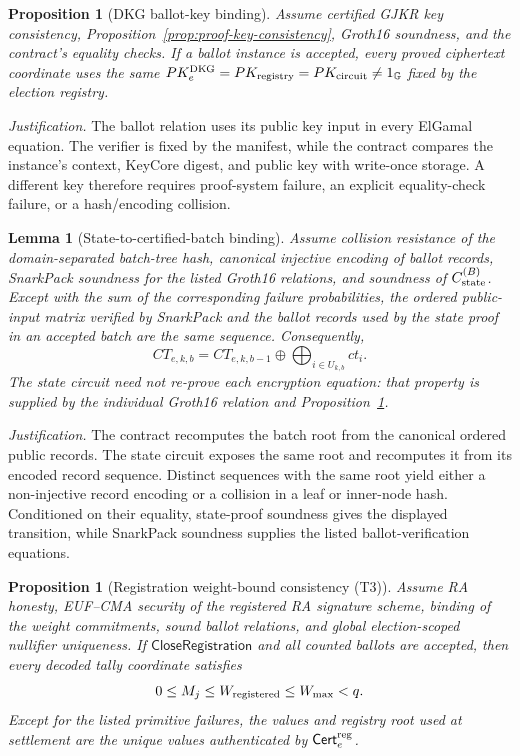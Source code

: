 \documentclass[pdflatex,sn-mathphys-num]{sn-jnl}%
\theoremstyle{thmstyleone}%
\newtheorem{proposition}[theorem]{Proposition}%
\newtheorem{lemma}[theorem]{Lemma}%
\theoremstyle{thmstyletwo}%
\theoremstyle{thmstylethree}%
\begin{document}
\begin{proposition}[DKG ballot-key binding]
\label{prop:vote-finalized-key}
Assume certified GJKR key consistency, Proposition~\ref{prop:proof-key-consistency},
Groth16 soundness, and the contract's equality checks.  If a ballot instance is
accepted, every proved ciphertext coordinate uses the same
$PK_e^{\rm DKG}=PK_{\rm registry}=PK_{\rm circuit}\neq1_{\mathbb G}$ fixed by
the election registry.
\end{proposition}

\textit{Justification.}  The ballot relation uses its public key input in every
ElGamal equation.  The verifier is fixed by the manifest, while the contract
compares the instance's context, KeyCore digest, and public key with write-once
storage.  A different key therefore requires proof-system failure, an explicit
equality-check failure, or a hash/encoding collision.

\begin{lemma}[State-to-certified-batch binding]
\label{lem:state-certified-batch}
Assume collision resistance of the domain-separated batch-tree hash,
canonical injective encoding of ballot records, SnarkPack soundness for the
listed Groth16 relations, and soundness of $C_{\rm state}^{(B)}$.  Except with
the sum of the corresponding failure probabilities, the ordered public-input
matrix verified by SnarkPack and the ballot records used by the state proof in
an accepted batch are the same sequence.  Consequently,
\[
 CT_{e,k,b}=CT_{e,k,b-1}\oplus
             \bigoplus_{i\in U_{k,b}}ct_i.
\]
The state circuit need not re-prove each encryption equation: that property is
supplied by the individual Groth16 relation and
Proposition~\ref{prop:vote-finalized-key}.
\end{lemma}

\textit{Justification.}  The contract recomputes the batch root from the
canonical ordered public records.  The state circuit exposes the same root and
recomputes it from its encoded record sequence.  Distinct sequences with the
same root yield either a non-injective record encoding or a collision in a
leaf or inner-node hash.  Conditioned on their equality, state-proof soundness
gives the displayed transition, while SnarkPack soundness supplies the listed
ballot-verification equations.

\begin{proposition}[Registration weight-bound consistency (T3)]
\label{prop:registration-weight-bound}
Assume RA honesty, EUF--CMA security of the registered RA signature scheme,
binding of the weight commitments, sound ballot relations, and global
election-scoped nullifier uniqueness.  If
$\mathsf{CloseRegistration}$ and all counted ballots are accepted, then every
decoded tally coordinate satisfies
\[
 0\leq M_j\leq W_{\rm registered}\leq W_{\max}<q.
\]
Except for the listed primitive failures, the values and registry root used at
settlement are the unique values authenticated by
$\mathsf{Cert}_e^{\rm reg}$.
\end{proposition}
\end{document}
